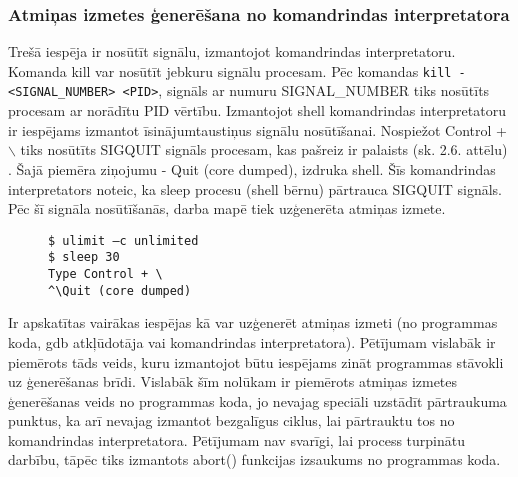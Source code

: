 \subsubsection{Atmiņas izmetes ģenerēšana no komandrindas interpretatora}
Trešā iespēja ir nosūtīt signālu, izmantojot komandrindas interpretatoru. 
Komanda kill var nosūtīt jebkuru signālu procesam.
Pēc komandas  \texttt{kill -<SIGNAL\_NUMBER> <PID>}, signāls ar numuru  SIGNAL\_NUMBER tiks nosūtīts procesam ar norādītu PID vērtību.
Izmantojot shell komandrindas interpretatoru ir  iespējams izmantot īsinājumtaustiņus signālu nosūtīšanai. 
Nospiežot Control + $\backslash$ tiks nosūtīts SIGQUIT signāls procesam, kas pašreiz ir palaists (sk. 2.6. attēlu) \cite {nosacijumi}. 
Šajā piemēra ziņojumu - Quit (core dumped), izdruka shell. 
Šīs komandrindas interpretators noteic, ka  sleep procesu (shell bērnu) pārtrauca SIGQUIT signāls. 
Pēc šī signāla nosūtīšanās, darba mapē tiek uzģenerēta atmiņas izmete. 

\begin{figure}[h]
\begin{lstlisting}[style=customgdb]
$ ulimit –c unlimited
$ sleep 30
Type Control + \
^\Quit (core dumped)
\end{lstlisting}
\caption{\textbf{\fontsize{11}{12}\selectfont {Atmiņas izmetes ģenerēšana, izmantojot īsinājumtaustiņus}}}
\end{figure}
 Ir apskatītas vairākas iespējas kā var uzģenerēt atmiņas izmeti (no programmas koda,  gdb atkļūdotāja vai komandrindas interpretatora).
 Pētījumam vislabāk ir piemērots tāds veids, kuru izmantojot būtu iespējams zināt programmas stāvokli uz ģenerēšanas brīdi.
 Vislabāk šīm nolūkam ir piemērots atmiņas izmetes ģenerēšanas veids no programmas koda, jo nevajag speciāli uzstādīt pārtraukuma punktus, ka arī nevajag izmantot bezgalīgus ciklus, lai  pārtrauktu tos no komandrindas interpretatora.
 Pētījumam nav svarīgi, lai process turpinātu darbību, tāpēc tiks izmantots abort() funkcijas izsaukums no programmas koda.
 
 

